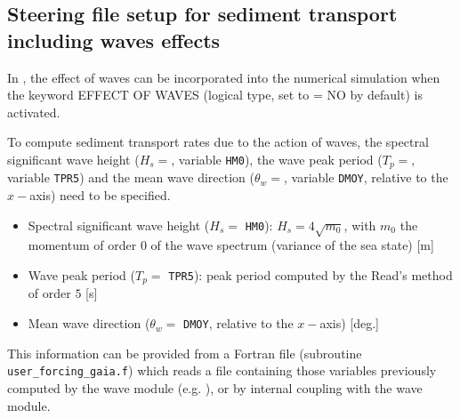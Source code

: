 \subsection{Steering file setup for sediment transport including waves effects}
In \gaia{}, the effect of waves can be incorporated into the numerical simulation when the keyword
 {\ttfamily EFFECT OF WAVES} (logical type, set to {\ttfamily = NO} by default) is activated.

 To compute sediment transport rates due to the action of waves, the spectral significant wave height ($H_s =$, variable \texttt{HM0}), the wave peak period ($T_p =$, variable \texttt{TPR5}) and the mean wave direction ($\theta_w =$, variable \texttt{DMOY}, relative to the $x-$axis) need to be specified.

 \begin{itemize}
\item Spectral significant wave height ($H_s =$ \texttt{HM0}): $H_s=4\sqrt{m_0}$, with $m_0$ the momentum of order $0$ of the wave spectrum (variance of the sea state) [m]
\vspace{0.2cm}
\item Wave peak period ($T_p =$ \texttt{TPR5}): peak period computed by the Read's method of order $5$ [s]
\vspace{0.2cm}
\item Mean wave direction ($\theta_w =$ \texttt{DMOY}, relative to the $x-$axis) [deg.]
\end{itemize}

 This information can be provided from a Fortran file (subroutine \texttt{user\_forcing\_gaia.f}) which reads a file containing those variables previously computed by the wave module (e.g. \tomawac{}), or by internal coupling with the wave module.

